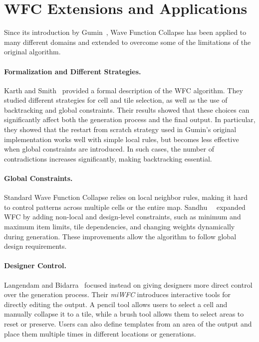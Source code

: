 \documentclass[../../main.tex]{subfiles}
\begin{document}
\section{WFC Extensions and Applications}
\label{sec:wfc_variants}

Since its introduction by Gumin~, Wave Function Collapse has been applied to many different domains and extended to overcome some of the limitations of the original algorithm.

\paragraph{Formalization and Different Strategies.}

Karth and Smith~ provided a formal description of the WFC algorithm. They studied different strategies for cell and tile selection, as well as the use of backtracking and global constraints. Their results showed that these choices can significantly affect both the generation process and the final output. In particular, they showed that the restart from scratch strategy used in Gumin's original implementation works well with simple local rules, but becomes less effective when global constraints are introduced. In such cases, the number of contradictions increases significantly, making backtracking essential.

\paragraph{Global Constraints.}

Standard Wave Function Collapse relies on local neighbor rules, making it hard to control patterns across multiple cells or the entire map. Sandhu~\etal~ expanded WFC by adding non-local and design-level constraints, such as minimum and maximum item limits, tile dependencies, and changing weights dynamically during generation. These improvements allow the algorithm to follow global design requirements.

\paragraph{Designer Control.}

Langendam and Bidarra~ focused instead on giving designers more direct control over the generation process. Their \emph{miWFC} introduces interactive tools for directly editing the output. A pencil tool allows users to select a cell and manually collapse it to a tile, while a brush tool allows them to select areas to reset or preserve. Users can also define templates from an area of the output and place them multiple times in different locations or generations.
\end{document}
